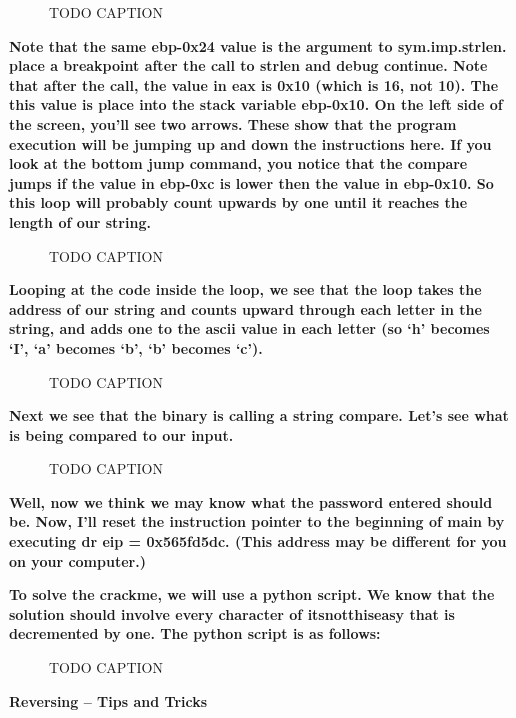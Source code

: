 \documentclass[letterpaper]{article}
\newcommand{\sitfig}[3]{
\begin{figure}[H]
\centering
\makebox[\textwidth][c]{
#2
}
\caption{#3}
\label{#1}
\end{figure}
}
\newcommand{\sitgfx}[4][scale=1.0]{
\sitfig{#3}{\texttt{[image: \#2]}}{#4}
}
\begin{document}
  
\sitgfx[width=6.5in,height=4.0626in]{FINALWORKINGDOCFORMERLYPRECURSOR-img061.png}{fig:unk}{TODO CAPTION}
 

\textbf{Note that the same ebp-0x24 value is the argument to sym.imp.strlen. place a breakpoint after the call to strlen
and debug continue. Note that after the call, the value in eax is 0x10 (which is 16, not 10). The this value is place
into the stack variable ebp-0x10. On the left side of the screen, you'll see two arrows. These show that the program
execution will be jumping up and down the instructions here. If you look at the bottom jump command, you notice that
the compare jumps if the value in ebp-0xc is lower then the value in ebp-0x10. So this loop will probably count upwards
by one until it reaches the length of our string.}

  
\sitgfx[width=6.5in,height=4.0626in]{FINALWORKINGDOCFORMERLYPRECURSOR-img062.png}{fig:unk}{TODO CAPTION}
 

\textbf{Looping at the code inside the loop, we see that the loop takes the address of our string and counts upward
through each letter in the string, and adds one to the ascii value in each letter (so `h' becomes `I', `a' becomes `b',
`b' becomes `c').}

  
\sitgfx[width=6.5in,height=4.0626in]{FINALWORKINGDOCFORMERLYPRECURSOR-img063.png}{fig:unk}{TODO CAPTION}
 

\textbf{Next we see that the binary is calling a string compare. Let's see what is being compared to our input.}

  
\sitgfx[width=6.5in,height=4.0626in]{FINALWORKINGDOCFORMERLYPRECURSOR-img064.png}{fig:unk}{TODO CAPTION}
 

\textbf{Well, now we think we may know what the password entered should be. Now, I'll reset the instruction pointer to
the beginning of main by executing dr eip = 0x565fd5dc. (This address may be different for you on your computer.)}

\textbf{To solve the crackme, we will use a python script. We know that the solution should involve every character of
itsnotthiseasy that is decremented by one. The python script is as follows:}

  
\sitgfx[width=6.5in,height=4.0626in]{FINALWORKINGDOCFORMERLYPRECURSOR-img065.png}{fig:unk}{TODO CAPTION}
 

{\centering
\textbf{Reversing -- Tips and Tricks}
\par}
\end{document}
